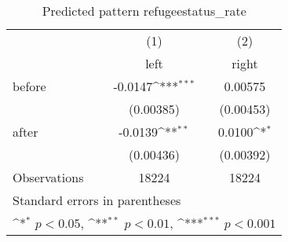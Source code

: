 \begin{table}[htbp]\centering
\def\sym#1{\ifmmode^{#1}\else\(^{#1}\)\fi}
\caption{Predicted pattern refugeestatus\_rate}
\begin{tabular}{l*{2}{c}}
\hline\hline
                    &\multicolumn{1}{c}{(1)}&\multicolumn{1}{c}{(2)}\\
                    &\multicolumn{1}{c}{left}&\multicolumn{1}{c}{right}\\
\hline
before              &     -0.0147\sym{***}&     0.00575         \\
                    &   (0.00385)         &   (0.00453)         \\
[1em]
after               &     -0.0139\sym{**} &      0.0100\sym{*}  \\
                    &   (0.00436)         &   (0.00392)         \\
\hline
Observations        &       18224         &       18224         \\
\hline\hline
\multicolumn{3}{l}{\footnotesize Standard errors in parentheses}\\
\multicolumn{3}{l}{\footnotesize \sym{*} \(p<0.05\), \sym{**} \(p<0.01\), \sym{***} \(p<0.001\)}\\
\end{tabular}
\end{table}
